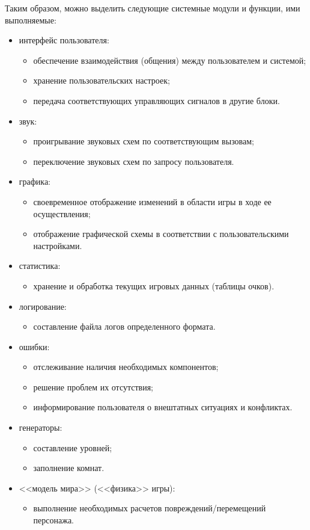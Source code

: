 \documentclass[12pt,a4paper,fullpage,titlepage]{article}
\begin{document}
Таким образом, можно выделить следующие системные модули и функции, ими выполняемые:
\begin{itemize}
	\item интерфейс пользователя:
	\begin{itemize}
		\item обеспечение взаимодействия (общения) между пользователем и системой;
		\item хранение пользовательских настроек;
		\item передача соответствующих управляющих сигналов в другие блоки.
	\end{itemize}
	\item звук:
	\begin{itemize}
		\item проигрывание звуковых схем по соответствующим вызовам;
		\item переключение звуковых схем по запросу пользователя.
	\end{itemize}
	\item графика:
	\begin{itemize}
		\item своевременное отображение изменений в области игры в ходе ее осуществления;
		\item отображение графической схемы в соответствии с пользовательскими настройками.
	\end{itemize}
	\item статистика:
	\begin{itemize}
		\item хранение и обработка текущих игровых данных (таблицы очков).
	\end{itemize}
	\item логирование:
	\begin{itemize}
		\item составление файла логов определенного формата.\\
	\end{itemize}	
	\item ошибки:
	\begin{itemize}
		\item отслеживание наличия необходимых компонентов;
		\item решение проблем их отсутствия;
		\item информирование пользователя о внештатных ситуациях и конфликтах.
	\end{itemize}
	\item генераторы:	
	\begin{itemize}
		\item составление уровней;
		\item заполнение комнат.
	\end{itemize}
	\item <<модель мира>> (<<физика>> игры):
	\begin{itemize}
		\item выполнение необходимых расчетов повреждений/перемещений персонажа.
	\end{itemize}
\end{itemize}
\end{document}
